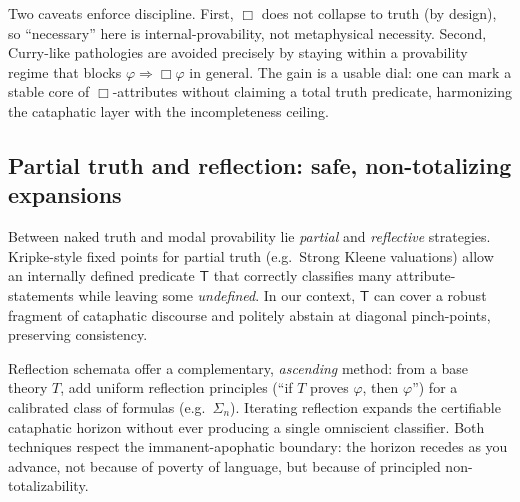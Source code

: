 \documentclass[11pt]{article}
\theoremstyle{upright}
\begin{document}
Two caveats enforce discipline. First, \(\Box\) does not collapse to truth (by design), so “necessary” here is internal-provability, not metaphysical necessity. Second, Curry-like pathologies are avoided precisely by staying within a provability regime that blocks \(\varphi \Rightarrow \Box\varphi\) in general. The gain is a usable dial: one can mark a stable core of \(\Box\)-attributes without claiming a total truth predicate, harmonizing the cataphatic layer with the incompleteness ceiling.

\subsection{Partial truth and reflection: safe, non-totalizing expansions}
Between naked truth and modal provability lie \emph{partial} and \emph{reflective} strategies. Kripke-style fixed points for partial truth (e.g.\ Strong Kleene valuations) allow an internally defined predicate \(\mathsf{T}\) that correctly classifies many attribute-statements while leaving some \emph{undefined}. In our context, \(\mathsf{T}\) can cover a robust fragment of cataphatic discourse and politely abstain at diagonal pinch-points, preserving consistency.

Reflection schemata \citep{Feferman1960} offer a complementary, \emph{ascending} method: from a base theory \(T\), add uniform reflection principles (“if \(T\) proves \(\varphi\), then \(\varphi\)”) for a calibrated class of formulas (e.g.\ \(\Sigma_n\)). Iterating reflection expands the certifiable cataphatic horizon without ever producing a single omniscient classifier. Both techniques respect the immanent-apophatic boundary: the horizon recedes as you advance, not because of poverty of language, but because of principled non-totalizability.
\end{document}
